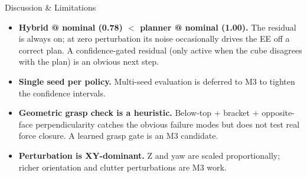 \documentclass[aspectratio=169, 10pt]{beamer}
\begin{document}
\begin{frame}{Discussion \& Limitations}
  \small
  \begin{itemize}
    \item \textbf{Hybrid @ nominal (0.78) $<$ planner @ nominal (1.00).}
          The residual is always on; at zero perturbation its noise
          occasionally drives the EE off a correct plan. A
          confidence-gated residual (only active when the cube
          disagrees with the plan) is an obvious next step.
    \item \textbf{Single seed per policy.} Multi-seed evaluation is
          deferred to M3 to tighten the confidence intervals.
    \item \textbf{Geometric grasp check is a heuristic.} Below-top +
          bracket + opposite-face perpendicularity catches the obvious
          failure modes but does not test real force closure.
          A learned grasp gate is an M3 candidate.
    \item \textbf{Perturbation is XY-dominant.} Z and yaw are scaled
          proportionally; richer orientation and clutter perturbations
          are M3 work.
  \end{itemize}
\end{frame}

\end{document}
